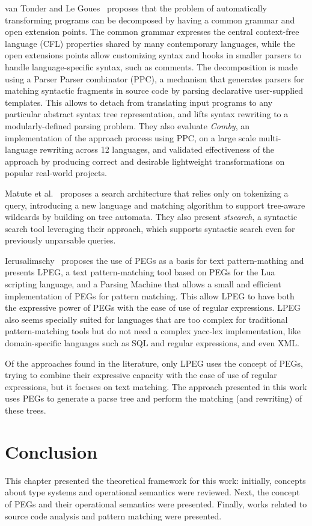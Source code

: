 van Tonder and Le Goues~\cite{vanTonder2019-syntax-transformation-ppc} proposes
that the problem of automatically transforming programs can be decomposed by
having a common grammar and open extension points. The common grammar expresses
the central context-free language (CFL) properties shared by many contemporary
languages, while the open extensions points allow customizing syntax and hooks
in smaller parsers to handle language-specific syntax, such as comments.
The decomposition is made using a Parser Parser combinator (PPC), a mechanism
that generates parsers for matching syntactic fragments in source code by parsing
declarative user-supplied templates.
This allows to detach from translating input programs to any particular
abstract syntax tree representation, and lifts syntax rewriting to a
modularly-defined parsing problem.
They also evaluate \textit{Comby}, an implementation of the approach process
using PPC, on a large scale multi-language rewriting across 12 languages, and
validated effectiveness of the approach by producing correct and desirable
lightweight transformations on popular real-world projects.

Matute et al.~\cite{matute2024-sequence-tree-matching} proposes a search
architecture that relies only on tokenizing a query, introducing a new
language and matching algorithm to support tree-aware wildcards by building
on tree automata. They also present \textit{stsearch}, a syntactic search
tool leveraging their approach, which supports syntactic search even for
previously unparsable queries.

Ierusalimschy~\cite{ierusalimschy2009-lpeg} proposes the use of PEGs as a basis
for text pattern-mathing and presents LPEG, a text pattern-matching tool based on
PEGs for the Lua scripting language, and a Parsing Machine that allows a small
and efficient implementation of PEGs for pattern matching.
This allow LPEG to have both the expressive power of PEGs with the ease of use
of regular expressions.
LPEG also seems specially suited for languages that are too complex for
traditional pattern-matching tools but do not need a complex yacc-lex
implementation, like domain-specific languages such as SQL and regular
expressions, and even XML.

Of the approaches found in the literature, only LPEG uses the concept of PEGs,
trying to combine their expressive capacity with the ease of use of regular
expressions, but it focuses on text matching. The approach presented in this
work uses PEGs to generate a parse tree and perform the matching (and rewriting)
of these trees.

\section{Conclusion}\label{sec:background-conclusion}

This chapter presented the theoretical framework for this work: initially, concepts
about type systems and operational semantics were reviewed. Next, the concept
of PEGs and their operational semantics were presented. Finally, works related
to source code analysis and pattern matching were presented.

\cleardoublepage
